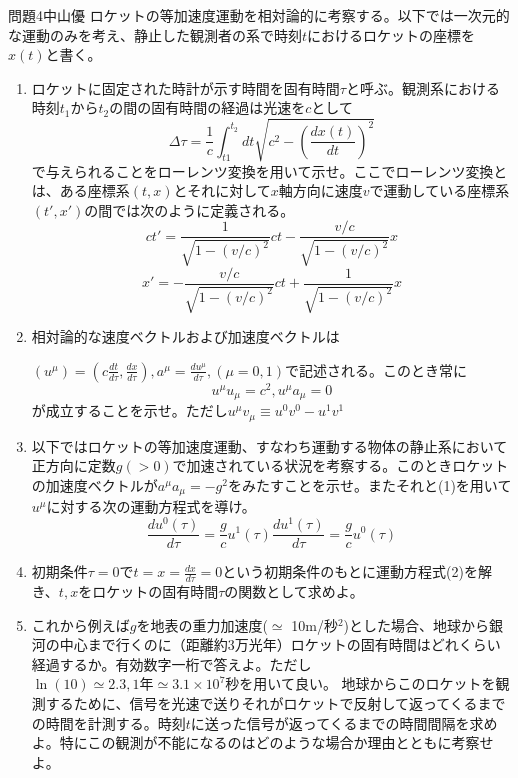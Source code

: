 \documentclass[fleqn]{jbook}
\begin{document}
\begin{question}{問題4}{中山優}
ロケットの等加速度運動を相対論的に考察する。以下では一次元的な運動のみを考え、静止した観測者の系で時刻$t$におけるロケットの座標を$x(t)$と書く。
\begin{enumerate}
	\item ロケットに固定された時計が示す時間を固有時間$\tau$と呼ぶ。観測系における時刻$t_1$から$t_2$の間の固有時間の経過は光速を$c$として
	$$ \Delta\tau = \frac{1}{c}\int_{t1}^{t_2} dt \sqrt{c^2-\left(\frac{dx(t)}{dt}\right)^2} $$
	で与えられることをローレンツ変換を用いて示せ。ここでローレンツ変換とは、ある座標系$(t,x)$とそれに対して$x$軸方向に速度$v$で運動している座標系$(t',x')$の間では次のように定義される。
	$$ ct' = \frac{1}{\sqrt{1-(v/c)^2}}ct - \frac{v/c}{\sqrt{1-(v/c)^2}}x $$
	$$ x' =  - \frac{v/c}{\sqrt{1-(v/c)^2}}ct + \frac{1}{\sqrt{1-(v/c)^2}}x $$
	
	\item 相対論的な速度ベクトルおよび加速度ベクトルは
	
	$(u^{\mu}) = (c\frac{dt}{d\tau},\frac{dx}{d\tau}),a^{\mu} = \frac{du^{\mu}}{d\tau},(\mu = 0,1)$で記述される。このとき常に
	\begin{equation}
	u^{\mu}u_{\mu} = c^2,　u^{\mu}a_{\mu} = 0
	\end{equation}
	が成立することを示せ。ただし$u^{\mu}v_{\mu} \equiv u^{0}v^{0}-u^{1}v^{1}$
	
	\item 以下ではロケットの等加速度運動、すなわち運動する物体の静止系において正方向に定数$g(>0)$で加速されている状況を考察する。このときロケットの加速度ベクトルが$a^{\mu}a_{\mu} = -g^2$をみたすことを示せ。またそれと(1)を用いて$u^{\mu}$に対する次の運動方程式を導け。
	\begin{equation}
	\frac{du^0(\tau)}{d\tau} = \frac{g}{c}u^1(\tau)　\frac{du^1(\tau)}{d\tau} = \frac{g}{c}u^0(\tau)
	\end{equation}
	\item 初期条件$\tau = 0$で$t=x=\frac{dx}{d\tau} = 0$という初期条件のもとに運動方程式(2)を解き、$t,x$をロケットの固有時間$\tau$の関数として求めよ。
	\item これから例えば$g$を地表の重力加速度($\simeq$ 10m/秒$^2$)とした場合、地球から銀河の中心まで行くのに（距離約3万光年）ロケットの固有時間はどれくらい経過するか。有効数字一桁で答えよ。ただし$\ln(10) \simeq 2.3,1年 \simeq 3.1 \times 10^7 秒$を用いて良い。
	\SubQuestion 地球からこのロケットを観測するために、信号を光速で送りそれがロケットで反射して返ってくるまでの時間を計測する。時刻$t$に送った信号が返ってくるまでの時間間隔を求めよ。特にこの観測が不能になるのはどのような場合か理由とともに考察せよ。
	\end{enumerate}
\end{question}
\end{document}
